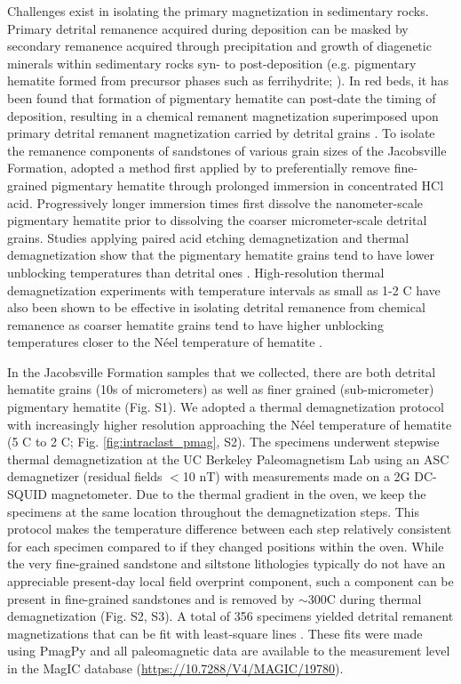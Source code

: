 \documentclass[draft]{agujournal2019}
\begin{document}
Challenges exist in isolating the primary magnetization in sedimentary rocks. Primary detrital remanence acquired during deposition can be masked by secondary remanence acquired through precipitation and growth of diagenetic minerals within sedimentary rocks syn- to post-deposition (e.g. pigmentary hematite formed from precursor phases such as ferrihydrite; ). In red beds, it has been found that formation of pigmentary hematite can post-date the timing of deposition, resulting in a chemical remanent magnetization superimposed upon primary detrital remanent magnetization carried by detrital grains \cite{Collinson1974a, Tauxe1980a}. To isolate the remanence components of sandstones of various grain sizes of the Jacobsville Formation,  adopted a method first applied by  to preferentially remove fine-grained pigmentary hematite through prolonged immersion in concentrated HCl acid. Progressively longer immersion times first dissolve the nanometer-scale pigmentary hematite prior to dissolving the coarser micrometer-scale detrital grains. Studies applying paired acid etching demagnetization and thermal demagnetization show that the pigmentary hematite grains tend to have lower unblocking temperatures than detrital ones \cite{Tauxe1980a, Bilardello2010c}. High-resolution thermal demagnetization experiments with temperature intervals as small as 1-2 \textdegree C have also been shown to be effective in isolating detrital remanence from chemical remanence as coarser hematite grains tend to have higher unblocking temperatures closer to the N\'eel temperature of hematite \cite{Jiang2015a,Swanson-Hysell2019b}. 

In the Jacobsville Formation samples that we collected, there are both detrital hematite grains (10s of micrometers) as well as finer grained (sub-micrometer) pigmentary hematite (Fig. S1). We adopted a thermal demagnetization protocol with increasingly higher resolution approaching the N\'eel temperature of hematite (5 \textdegree C to 2 \textdegree C; Fig. \ref{fig:intraclast_pmag}, S2). The specimens underwent stepwise thermal demagnetization at the UC Berkeley Paleomagnetism Lab using an ASC demagnetizer (residual fields $<$10 nT) with measurements made on a 2G DC-SQUID magnetometer. Due to the thermal gradient in the oven, we keep the specimens at the same location throughout the demagnetization steps. This protocol makes the temperature difference between each step relatively consistent for each specimen compared to if they changed positions within the oven. While the very fine-grained sandstone and siltstone lithologies typically do not have an appreciable present-day local field overprint component, such a component can be present in fine-grained sandstones and is removed by $\sim$300\textdegree C during thermal demagnetization (Fig. S2, S3). A total of 356 specimens yielded detrital remanent magnetizations that can be fit with least-square lines \cite{Kirschvink1980a}. These fits were made using PmagPy \cite{Tauxe2016a} and all paleomagnetic data are available to the measurement level in the MagIC database (\url{https://10.7288/V4/MAGIC/19780}).
\end{document}
